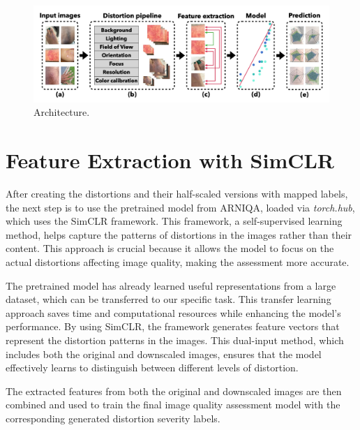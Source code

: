 \begin{figure}[ht]
    \centering
    \includegraphics[keepaspectratio,width=15cm]{img/Architecture.jpg}
    \caption{Architecture.}
    \label{fig:Architecture}
\end{figure}

\section{Feature Extraction with SimCLR}
\label{sec:FeatureExtraction}
After creating the distortions and their half-scaled versions with mapped labels, the next step is to use the pretrained model from ARNIQA, loaded via \textit{torch.hub}, which uses the SimCLR framework. This framework, a self-supervised learning method, helps capture the patterns of distortions in the images rather than their content. This approach is crucial because it allows the model to focus on the actual distortions affecting image quality, making the assessment more accurate. \par
\vspace{\baselineskip}
\noindent
The pretrained model has already learned useful representations from a large dataset, which can be transferred to our specific task. This transfer learning approach saves time and computational resources while enhancing the model's performance. By using SimCLR, the framework generates feature vectors that represent the distortion patterns in the images. This dual-input method, which includes both the original and downscaled images, ensures that the model effectively learns to distinguish between different levels of distortion.\par
\vspace{\baselineskip}
\noindent
The extracted features from both the original and downscaled images are then combined and used to train the final image quality assessment model with the corresponding generated distortion severity labels. \par

